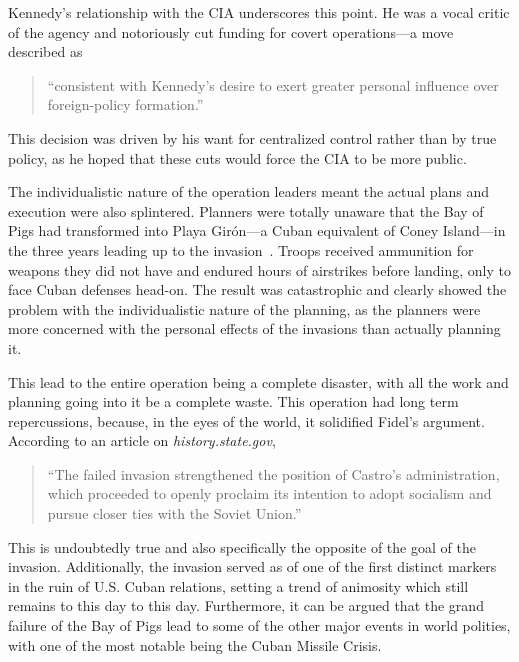 \documentclass[12pt]{article}
\begin{document}
    Kennedy's relationship with the CIA underscores this point. He was a vocal critic of the agency and notoriously cut funding for covert operations—a move described as 
    
    \begin{quotation}
        ``consistent with Kennedy's desire to exert greater personal influence over foreign-policy formation.''~\parencite{JeffreysJones2003}
    \end{quotation}

    This decision was driven by his want for centralized control rather than by true policy, as he hoped that these cuts would force the CIA to be more public.

    The individualistic nature of the operation leaders meant the actual plans and execution were also splintered. Planners were totally unaware that the Bay of Pigs had transformed into Playa Girón—a Cuban equivalent of Coney Island—in the three years leading up to the invasion~\parencite{Wyden1979}. Troops received ammunition for weapons they did not have and endured hours of airstrikes before landing, only to face Cuban defenses head-on. The result was catastrophic and clearly showed the problem with the individualistic nature of the planning, as the planners were more concerned with the personal effects of the invasions than actually planning it. 

    This lead to the entire operation being a complete disaster, with all the work and planning going into it be a complete waste. This operation had long term repercussions, because, in the eyes of the world, it solidified Fidel's argument. According to an article on \textit{history.state.gov}, 

    \begin{quotation}
        ``The failed invasion strengthened the position of Castro's administration, which proceeded to openly proclaim its intention to adopt socialism and pursue closer ties with the Soviet Union.'' \parencite{state_bayofpigs}
    \end{quotation}

    This is undoubtedly true and also specifically the opposite of the goal of the invasion. Additionally, the invasion served as of one of the first distinct markers in the ruin of U.S. Cuban relations, setting a trend of animosity which still remains to this day to this day. Furthermore, it can be argued that the grand failure of the Bay of Pigs lead to some of the other major events in world polities, with one of the most notable being the Cuban Missile Crisis. \parencite{cfr_uscuba} 
\end{document}
